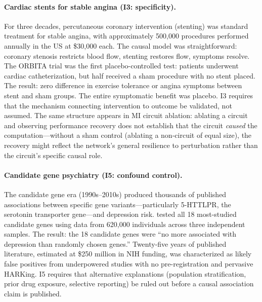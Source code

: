 \documentclass{article}
\begin{document}
\paragraph{Cardiac stents for stable angina (I3: specificity).}
For three decades, percutaneous coronary intervention (stenting) was standard treatment for stable angina, with approximately 500,000 procedures performed annually in the US at \$30,000 each. The causal model was straightforward: coronary stenosis restricts blood flow, stenting restores flow, symptoms resolve. The ORBITA trial \citep{alhabib2018orbita} was the first placebo-controlled test: patients underwent cardiac catheterization, but half received a sham procedure with no stent placed. The result: zero difference in exercise tolerance or angina symptoms between stent and sham groups. The entire symptomatic benefit was placebo. I3 requires that the mechanism connecting intervention to outcome be validated, not assumed. The same structure appears in MI circuit ablation: ablating a circuit and observing performance recovery does not establish that the circuit \emph{caused} the computation---without a sham control (ablating a non-circuit of equal size), the recovery might reflect the network's general resilience to perturbation rather than the circuit's specific causal role.

\paragraph{Candidate gene psychiatry (I5: confound control).}
The candidate gene era (1990s--2010s) produced thousands of published associations between specific gene variants---particularly 5-HTTLPR, the serotonin transporter gene---and depression risk. \citet{border2019no} tested all 18 most-studied candidate genes using data from 620,000 individuals across three independent samples. The result: the 18 candidate genes were ``no more associated with depression than randomly chosen genes.'' Twenty-five years of published literature, estimated at \$250 million in NIH funding, was characterized as likely false positives from underpowered studies with no pre-registration and pervasive HARKing. I5 requires that alternative explanations (population stratification, prior drug exposure, selective reporting) be ruled out before a causal association claim is published.
\end{document}
